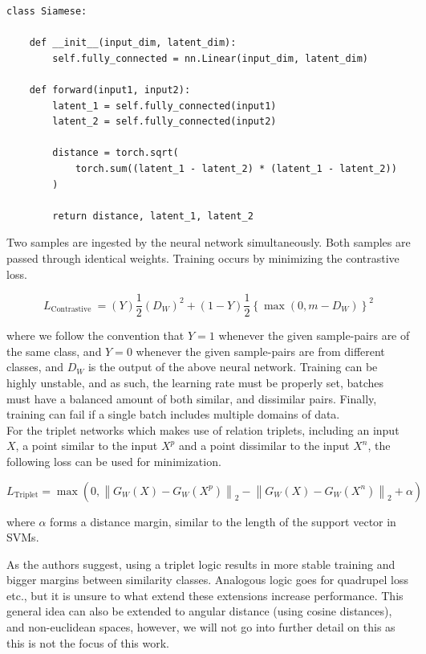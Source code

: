 \documentclass[a4paper,12pt,oneside,openright]{report}
\begin{document}
\begin{verbatim}
class Siamese:

    def __init__(input_dim, latent_dim):
        self.fully_connected = nn.Linear(input_dim, latent_dim)
        
    def forward(input1, input2):
        latent_1 = self.fully_connected(input1)
        latent_2 = self.fully_connected(input2)
        
        distance = torch.sqrt(
            torch.sum((latent_1 - latent_2) * (latent_1 - latent_2))
        )
        
        return distance, latent_1, latent_2
\end{verbatim}

Two samples are ingested by the neural network simultaneously.
Both samples are passed through identical weights.
Training occurs by minimizing the contrastive loss.

\begin{equation}
L_{\text {Contrastive }}=(Y) \frac{1}{2}\left(D_{W}\right)^{2}+(1-Y) \frac{1}{2}\left\{\max \left(0, m-D_{W}\right)\right\}^{2}
\end{equation}

where we follow the convention that $Y=1$ whenever the given sample-pairs are of the same class, and $Y=0$ whenever the given sample-pairs are from different classes, and $D_W$ is the output of the above neural network.
Training can be highly unstable, and as such, the learning rate must be properly set, batches must have a balanced amount of both similar, and dissimilar pairs. 
Finally, training can fail if a single batch includes multiple domains of data. \\

For the triplet networks \cite{hoffer14} which makes use of relation triplets, including an input $X$, a point similar to the input $X^p$ and a point dissimilar to the input $X^n$, the following loss can be used for minimization.

\begin{equation}
L_{\text {Triplet}}=\max \left(0,\left\|G_{W}(X)-G_{W}\left(X^{p}\right)\right\|_{2}-\left\|G_{W}(X)-G_{W}\left(X^{n}\right)\right\|_{2}+\alpha\right)
\end{equation} 

where $\alpha$ forms a distance margin, similar to the length of the support vector in SVMs.

As the authors suggest, using a triplet logic results in more stable training and bigger margins between similarity classes.
Analogous logic goes for quadrupel loss etc., but it is unsure to what extend these extensions increase performance.
This general idea can also be extended to angular distance (using cosine distances), and non-euclidean spaces, however, we will not go into further detail on this as this is not the focus of this work.
\end{document}
